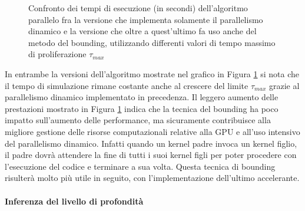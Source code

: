 \begin{figure}[t]
    \centering
    \caption{Confronto dei tempi di esecuzione (in secondi) dell'algoritmo
    parallelo fra la versione che implementa solamente il parallelismo dinamico
    e la versione che oltre a quest'ultimo fa uso anche del metodo del bounding,
    utilizzando differenti valori di tempo massimo di proliferazione
    $\tau_{max}$}
    \label{chart:dynamic-bounding}
\end{figure}
In entrambe la versioni dell'algoritmo mostrate nel grafico in Figura
\ref{chart:dynamic-bounding} si nota che il tempo di simulazione
rimane costante anche al crescere del limite $\tau_{max}$ grazie al parallelismo
dinamico implementato in precedenza.
Il leggero aumento delle prestazioni mostrato in Figura
\ref{chart:dynamic-bounding} indica che la tecnica
del bounding ha poco impatto sull'aumento delle performance, ma
sicuramente contribuisce alla migliore gestione delle risorse computazionali
relative alla GPU e all'uso intensivo del parallelismo dinamico. Infatti
quando un kernel padre invoca un kernel figlio,
il padre dovrà attendere la fine di tutti i suoi kernel figli per
poter procedere con l'esecuzione del codice e terminare a sua volta.
Questa tecnica di bounding risulterà molto più utile in seguito, con
l'implementazione dell'ultimo accelerante.

\paragraph{Inferenza del livello di profondità}\mbox{}


